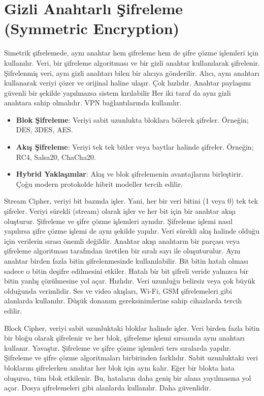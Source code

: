 \section{Gizli Anahtarlı Şifreleme (Symmetric Encryption)}

Simetrik şifrelemede, aynı anahtar hem şifreleme hem de şifre çözme işlemleri için kullanılır. Veri, bir şifreleme algoritması ve bir gizli anahtar kullanılarak şifrelenir. Şifrelenmiş veri, aynı gizli anahtarı bilen bir alıcıya gönderilir. Alıcı, aynı anahtarı kullanarak veriyi çözer ve orijinal haline ulaşır. Çok hızlıdır. Anahtar paylaşımı güvenli bir şekilde yapılmazsa sistem kırılabilir Her iki taraf da aynı gizli anahtara sahip olmalıdır. VPN bağlantılarında kullanılır. 

\begin{itemize}
    \item \textbf{Blok Şifreleme}: Veriyi sabit uzunlukta bloklara bölerek şifreler. Örneğin; DES, 3DES, AES.
    \item \textbf{Akış Şifreleme}: Veriyi tek tek bitler veya baytlar halinde şifreler. Örneğin; RC4, Salsa20, ChaCha20.
    \item \textbf{Hybrid Yaklaşımlar}: Akış ve blok şifrelemenin avantajlarını birleştirir. Çoğu modern protokolde hibrit modeller tercih edilir.
\end{itemize}

Stream Cipher, veriyi bit bazında işler. Yani, her bir veri bitini (1 veya 0) tek tek şifreler. Veriyi sürekli (stream) olarak işler ve her bit için bir anahtar akışı oluşturur. Şifreleme ve şifre çözme işlemleri aynıdır. Şifreleme işlemi nasıl yapılırsa şifre çözme işlemi de aynı şekilde yapılır. Veri sürekli akış halinde olduğu için verilerin sırası önemli değildir. Anahtar akışı anahtarın bir parçası veya şifreleme algoritması tarafından üretilen bir sıralı sayı ile oluşuturulur. Aynı anahtar birden fazla bitin şifrelenmesinde kullanılabilir. Bit bitin hatalı olması sadece o bitin deşifre edilmesini etkiler. Hatalı bir bit şifreli veride yalnızca bir bitin yanlış çözülmesine yol açar. Hızlıdır. Veri uzunluğu belirsiz veya çok büyük olduğunda verimlidir. Ses ve video akışları, Wi-Fi, GSM şifrelemeleri gibi alanlarda kullanılır. Düşük donanım gereksinimlerine sahip cihazlarda tercih edilir.

Block Cipher, veriyi sabit uzunluktaki bloklar halinde işler. Veri birden fazla bitin bir bloğu olarak şifrelenir ve her blok, şifreleme işlemi sırsaında aynı anahtarı kullanır. Yavaştır. Şifreleme ve şifre çözme işlemleri ters sıralarda yapılır. Şifreleme ve şifre çözme algoritmaları birbirinden farklıdır. Sabit uzunluktaki veri bloklarını şifrelerken anahtar her blok için aynı kalır. Eğer bir blokta hata oluşursa, tüm blok etkilenir. Bu, hataların daha geniş bir alana yayılmasına yol açar. Dosya şifrelemeleri gibi alanlarda kullanılır. Daha güvenlidir.

